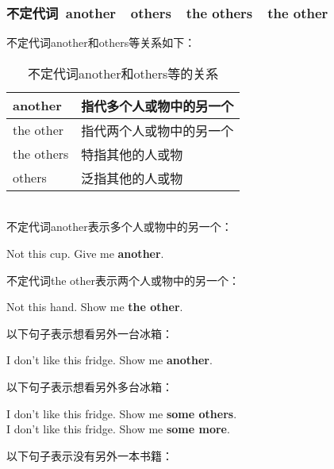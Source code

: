 \documentclass[UTF8]{ctexart}
\newcommand{\littf}[1]{{\hspace{3pt}\ttfamily #1}}
\begin{document}
\newpage

\subsubsection{不定代词~\littf{another}~~\littf{others}~~\littf{the others}~~\littf{the other}}
    不定代词\littf{another}和\littf{others}等关系如下：
    \begin{table}[h]
        \begin{center}
            \ttfamily
            \begin{tabular}{p{70pt}|p{160pt}}
                \hline
                another&指代多个人或物中的另一个\\ \hline
                the other&指代两个人或物中的另一个\\ \hline
                the others&特指其他的人或物\\ \hline
                others&泛指其他的人或物\\ \hline
            \end{tabular}
            \rmfamily
            \caption{不定代词\littf{another}和\littf{others}等的关系}
        \end{center}
    \end{table}\\
    不定代词\littf{another}表示多个人或物中的另一个：
    \begin{center}
        \large\ttfamily
        Not this cup. Give me \textbf{another}.\\[6mm]
    \end{center}
    不定代词\littf{the other}表示两个人或物中的另一个：
    \begin{center}
        \large\ttfamily
        Not this hand. Show me \textbf{the other}.\\[6mm]
    \end{center}
    以下句子表示想看另外一台冰箱：
    \begin{center}
        \large\ttfamily
        I don't like this fridge. Show me \textbf{another}.\\[6mm]
    \end{center}
    以下句子表示想看另外多台冰箱：
    \begin{center}
        \large\ttfamily
        I don't like this fridge. Show me \textbf{some others}.\\[3mm]
        I don't like this fridge. Show me \textbf{some more}.\\[6mm]
    \end{center}
    以下句子表示没有另外一本书籍：
\end{document}
